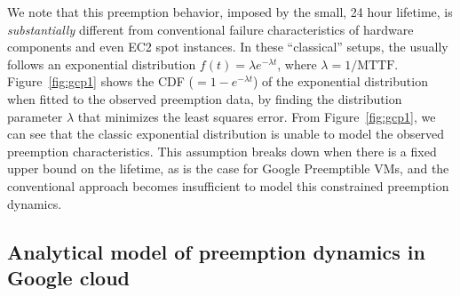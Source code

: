 
We note that this preemption behavior, imposed by the  small, 24 hour  lifetime, is \emph{substantially} different from conventional failure characteristics of hardware components and even EC2 spot instances.
In these ``classical'' setups, the  usually follows an exponential distribution $f(t) = \lambda e^{-\lambda t}$, where $\lambda=1/\text{MTTF}$.
Figure~\ref{fig:gcp1} shows the CDF ($=1-e^{-\lambda t}$) of the exponential distribution when fitted to the observed preemption data, by finding the distribution parameter $\lambda$ that minimizes the least squares error.
From Figure~\ref{fig:gcp1}, we can see that the classic exponential distribution is unable to model the observed preemption characteristics.
 This assumption breaks down when there is a fixed upper bound on the lifetime, as is the case for Google Preemptible VMs, and the conventional approach becomes insufficient to model this constrained preemption dynamics.

\subsection{Analytical model of preemption dynamics in Google cloud}

